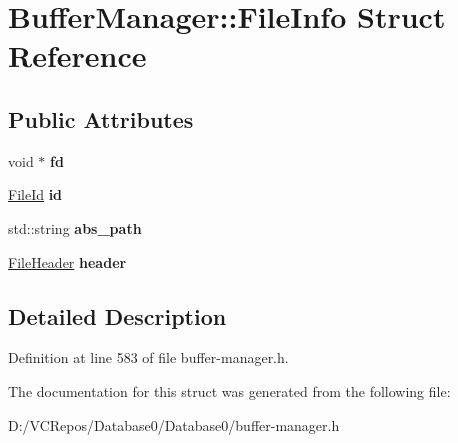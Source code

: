 \hypertarget{struct_buffer_manager_1_1_file_info}{}\section{Buffer\+Manager\+::File\+Info Struct Reference}
\label{struct_buffer_manager_1_1_file_info}
\subsection*{Public Attributes}
\begin{DoxyCompactItemize}
\item 
\mbox{\label{struct_buffer_manager_1_1_file_info_a1da00e0d025d3597d1da3ea19b77f237}} 
void $\ast$ {\bfseries fd}
\item 
\mbox{\label{struct_buffer_manager_1_1_file_info_ad676d44a1e8fe333132d97478304df4a}} 
\mbox{\hyperlink{struct_generic_i_o_id}{File\+Id}} {\bfseries id}
\item 
\mbox{\label{struct_buffer_manager_1_1_file_info_ab923801c01472d75e3d6cab62ab82ea8}} 
std\+::string {\bfseries abs\+\_\+path}
\item 
\mbox{\label{struct_buffer_manager_1_1_file_info_af6c5df179ba435080354a1d0a36472fc}} 
\mbox{\hyperlink{struct_buffer_manager_1_1_file_header}{File\+Header}} {\bfseries header}
\end{DoxyCompactItemize}


\subsection{Detailed Description}


Definition at line 583 of file buffer-\/manager.\+h.



The documentation for this struct was generated from the following file\+:\begin{DoxyCompactItemize}
\item 
D\+:/\+V\+C\+Repos/\+Database0/\+Database0/buffer-\/manager.\+h\end{DoxyCompactItemize}
